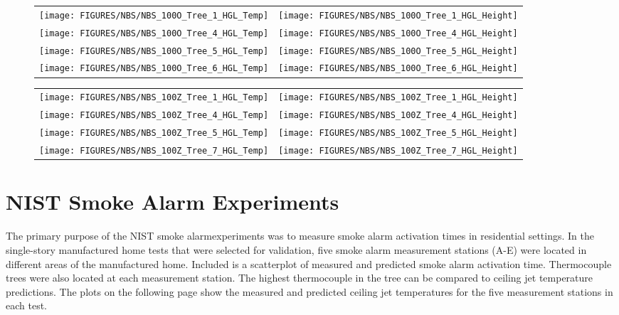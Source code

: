 \begin{figure}[p]
\begin{tabular*}{\textwidth}{l@{\extracolsep{\fill}}r}
\texttt{[image: FIGURES/NBS/NBS\_100O\_Tree\_1\_HGL\_Temp]} &
\texttt{[image: FIGURES/NBS/NBS\_100O\_Tree\_1\_HGL\_Height]} \\
\texttt{[image: FIGURES/NBS/NBS\_100O\_Tree\_4\_HGL\_Temp]} &
\texttt{[image: FIGURES/NBS/NBS\_100O\_Tree\_4\_HGL\_Height]} \\
\texttt{[image: FIGURES/NBS/NBS\_100O\_Tree\_5\_HGL\_Temp]} &
\texttt{[image: FIGURES/NBS/NBS\_100O\_Tree\_5\_HGL\_Height]}\\
\texttt{[image: FIGURES/NBS/NBS\_100O\_Tree\_6\_HGL\_Temp]} &
\texttt{[image: FIGURES/NBS/NBS\_100O\_Tree\_6\_HGL\_Height]}
\end{tabular*}
\end{figure}

\begin{figure}[p]
\begin{tabular*}{\textwidth}{l@{\extracolsep{\fill}}r}
\texttt{[image: FIGURES/NBS/NBS\_100Z\_Tree\_1\_HGL\_Temp]} &
\texttt{[image: FIGURES/NBS/NBS\_100Z\_Tree\_1\_HGL\_Height]} \\
\texttt{[image: FIGURES/NBS/NBS\_100Z\_Tree\_4\_HGL\_Temp]} &
\texttt{[image: FIGURES/NBS/NBS\_100Z\_Tree\_4\_HGL\_Height]} \\
\texttt{[image: FIGURES/NBS/NBS\_100Z\_Tree\_5\_HGL\_Temp]} &
\texttt{[image: FIGURES/NBS/NBS\_100Z\_Tree\_5\_HGL\_Height]}\\
\texttt{[image: FIGURES/NBS/NBS\_100Z\_Tree\_7\_HGL\_Temp]} &
\texttt{[image: FIGURES/NBS/NBS\_100Z\_Tree\_7\_HGL\_Height]}
\end{tabular*}
\end{figure}

\clearpage

\section{NIST Smoke Alarm Experiments}

The primary purpose of the NIST smoke alarmexperiments was to measure smoke alarm activation times in residential settings. In the single-story manufactured home tests that were selected for validation, five smoke alarm measurement stations (A-E) were located in different areas of the manufactured home. Included is a scatterplot of measured and predicted smoke alarm activation time. Thermocouple trees were also located at each measurement station. The highest thermocouple in the tree can be compared to ceiling jet temperature predictions. The plots on the following page show the measured and predicted ceiling jet temperatures for the five measurement stations in each test.

